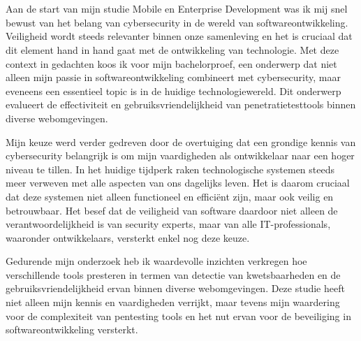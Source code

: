 
\chapter*{}%
\label{ch:voorwoord}


Aan de start van mijn studie Mobile en Enterprise Development was ik mij snel bewust van het belang van cybersecurity in de wereld van softwareontwikkeling. 
Veiligheid wordt steeds relevanter binnen onze samenleving en het is cruciaal dat dit element hand in hand gaat met de ontwikkeling van technologie. 
Met deze context in gedachten koos ik voor mijn bachelorproef, een onderwerp dat niet alleen mijn passie in softwareontwikkeling combineert met cybersecurity, 
maar eveneens een essentieel topic is in de huidige technologiewereld. Dit onderwerp evalueert de effectiviteit en 
gebruiksvriendelijkheid van penetratietesttools binnen diverse webomgevingen.

Mijn keuze werd verder gedreven door de overtuiging dat een grondige kennis van cybersecurity belangrijk is om mijn vaardigheden als ontwikkelaar naar een hoger niveau te tillen. In het huidige 
tijdperk raken technologische systemen steeds meer verweven met alle aspecten van ons dagelijks leven. Het is daarom cruciaal dat deze systemen niet alleen 
functioneel en efficiënt zijn, maar ook veilig en betrouwbaar. Het besef dat de veiligheid van software daardoor niet alleen de verantwoordelijkheid 
is van security experts, maar van alle IT-professionals, waaronder ontwikkelaars, versterkt enkel nog deze keuze.

Gedurende mijn onderzoek heb ik waardevolle inzichten verkregen hoe verschillende tools presteren in termen van detectie van kwetsbaarheden en de 
gebruiksvriendelijkheid ervan binnen diverse webomgevingen. Deze studie heeft niet alleen mijn kennis en vaardigheden 
verrijkt, maar tevens mijn waardering voor de complexiteit van pentesting tools en het nut ervan voor de beveiliging in softwareontwikkeling versterkt.

